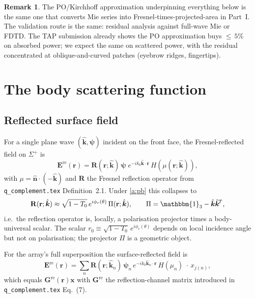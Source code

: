 \documentclass[11pt,a4paper]{article}
\theoremstyle{definition}
\newtheorem{remark}[remark]{Remark}
\newcommand{\khat}{\hat{\bm{k}}}
\newcommand{\nhat}{\hat{\bm{n}}}
\newcommand{\rr}{\mathbf{r}}
\newcommand{\EE}{\mathbf{E}}
\newcommand{\ident}{\mathbbm{1}}
\begin{document}
\begin{remark}
The PO/Kirchhoff approximation underpinning everything below is the
same one that converts Mie series into Fresnel-times-projected-area
in Part~I.  The validation route is the same: residual analysis
against full-wave Mie or FDTD.  The TAP submission already shows the
PO approximation buys $\le$\,$5\%$ on absorbed power; we expect the
same on scattered power, with the residual concentrated at
oblique-and-curved patches (eyebrow ridges, fingertips).
\end{remark}

\section{The body scattering function}\label{sec:Fb}

\subsection{Reflected surface field}

For a single plane wave $(\khat,\bm\psi)$ incident on the front face,
the Fresnel-reflected field on $\Sigma^+$ is
\begin{equation}\label{eq:Erefl-pw}
  \EE^{\mathrm{re}}(\rr) = \mathbf{R}(\rr;\khat)\,\bm\psi\;
                          e^{-ik_0\khat\cdot\rr}\,H(\mu(\rr;\khat)),
\end{equation}
with $\mu=\nhat\cdot(-\khat)$ and $\mathbf{R}$ the Fresnel reflection
operator from \texttt{q\_complement.tex} Definition~2.1.  Under
\ref{a:pb} this collapses to
\begin{equation}\label{eq:R-collapse}
  \mathbf{R}(\rr;\khat)\approx
   \sqrt{1-T_0}\,e^{i\phi_r(\theta)}\,\Pi(\rr;\khat),
   \qquad \Pi=\ident_3-\khat\khat^{\!T},
\end{equation}
i.e.\ the reflection operator is, locally, a polarisation projector
times a body-universal scalar.  The scalar
$r_0\equiv\sqrt{1-T_0}\,e^{i\phi_r(\theta)}$ depends on local
incidence angle but not on polarisation; the projector $\Pi$ is a
geometric object.

For the array's full superposition the surface-reflected field is
\begin{equation}\label{eq:Erefl-array}
  \EE^{\mathrm{re}}(\rr)=
  \sum_n \mathbf{R}(\rr;\khat_n)\,\bm\psi_n\,
        e^{-ik_0\khat_n\cdot\rr}\,H(\mu_n)\;\cdot\,x_{j(n)},
\end{equation}
which equals $\mathbf{G}^{\mathrm{re}}(\rr)\mathbf{x}$ with
$\mathbf{G}^{\mathrm{re}}$ the reflection-channel matrix introduced in
\texttt{q\_complement.tex} Eq.~(7).
\end{document}

